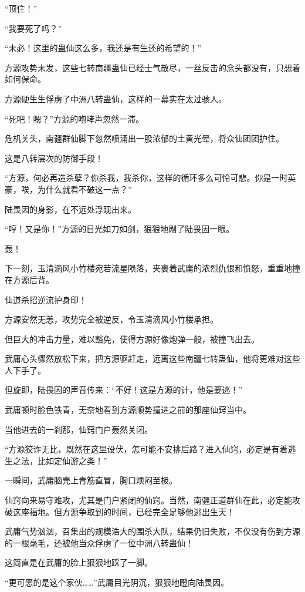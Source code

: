 \begin{this_body}
“顶住！”

“我要死了吗？”

“未必！这里的蛊仙这么多，我还是有生还的希望的！”

方源攻势未发，这些七转南疆蛊仙已经士气散尽，一丝反击的念头都没有，只想着如何保命。

方源硬生生俘虏了中洲八转蛊仙，这样的一幕实在太过骇人。

“死吧！嗯？”方源的咆哮声忽然一滞。

危机关头，南疆群仙脚下忽然喷涌出一股浓郁的土黄光晕，将众仙团团护住。

这是八转层次的防御手段！

“方源，何必再造杀孽？你杀我，我杀你，这样的循环多么可怜可悲。你是一时英豪，唉，为什么就看不破这一点？”

陆畏因的身影，在不远处浮现出来。

“哼！又是你！”方源的目光如刀如剑，狠狠地剐了陆畏因一眼。

轰！

下一刻，玉清滴风小竹楼宛若流星陨落，夹裹着武庸的浓烈仇恨和愤怒，重重地撞在方源后背。

仙道杀招逆流护身印！

方源安然无恙，攻势完全被逆反，令玉清滴风小竹楼承担。

但巨大的冲击力量，难以豁免，使得方源好像炮弹一般，被撞飞出去。

武庸心头骤然放松下来，把方源驱赶走，远离这些南疆七转蛊仙，他将更难对这些人下手了。

但旋即，陆畏因的声音传来：“不好！这是方源的计，他是要逃！”

武庸顿时脸色铁青，无奈地看到方源顺势撞进之前的那座仙窍当中。

当他进去的一刹那，仙窍门户轰然关闭。

“方源狡诈无比，既然在这里设伏，怎可能不安排后路？进入仙窍，必定是有着逃生之法，比如定仙游之类！”

一瞬间，武庸脑壳上青筋直冒，胸口烦闷至极。

仙窍向来易守难攻，尤其是门户紧闭的仙窍。当然，南疆正道群仙在此，必定能攻破这座福地。但方源争取到的时间，已经完全足够他逃出生天！

武庸气势汹汹，召集出的规模浩大的围杀大队，结果仍旧失败，不仅没有伤到方源的一根毫毛，还被他当众俘虏了一位中洲八转蛊仙！

这简直是在武庸的脸上狠狠地踩了一脚。

“更可恶的是这个家伙……”武庸目光阴沉，狠狠地瞪向陆畏因。


\end{this_body}

